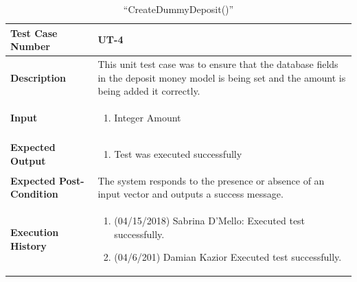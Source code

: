 \documentclass[12pt]{article}
\begin{document}
\begin{table}[H]
\caption{“CreateDummyDeposit()”}
\begin{center}
\begin{tabular}{|p{5.5cm}|p{11cm}|}
  \hline
  \bf Test Case Number & UT-4\\\hline
  \bf Description & 
This unit test case was to ensure that the database fields in the deposit money model is being set and the amount is being added it correctly.\\\hline
  \bf Input &
  \begin{enumerate}
  \item Integer Amount
  \end{enumerate}
  \\\hline
  \bf Expected Output &
  \begin{enumerate}
  \item Test was executed successfully
  \end{enumerate}
  \\\hline
  \bf Expected Post-Condition & 
  The system responds to the presence or absence of an input vector and outputs a success message.
  \\\hline   
  \bf Execution History & 
  \begin{enumerate}
  \item (04/15/2018) Sabrina D’Mello: Executed test successfully.
  \item (04/6/201) Damian Kazior Executed test successfully.
  \end{enumerate}
  \\\hline
\end{tabular}
\end{center}
\end{table}
\end{document}
